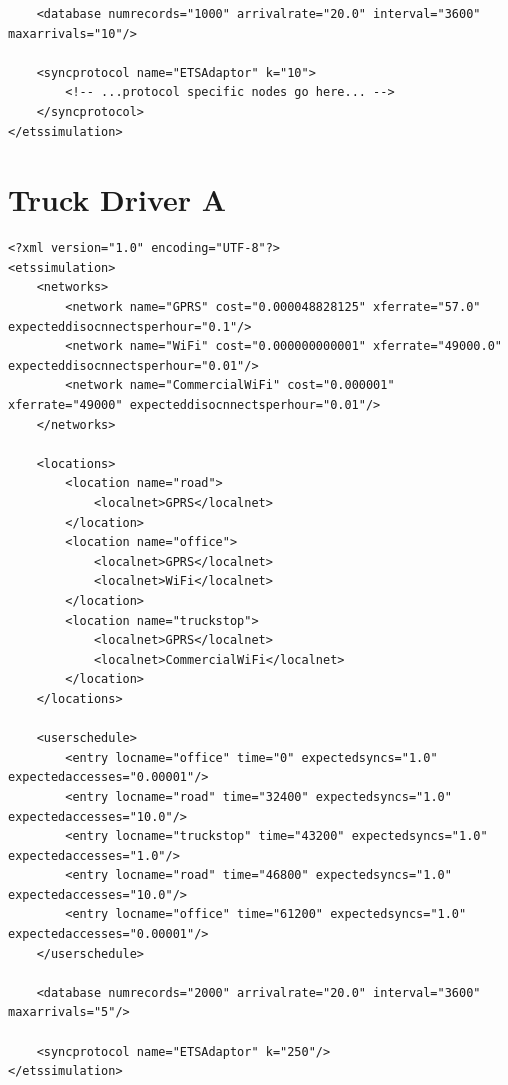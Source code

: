 \begin{lstlisting}
	<database numrecords="1000" arrivalrate="20.0" interval="3600" maxarrivals="10"/>
	
	<syncprotocol name="ETSAdaptor" k="10">
		<!-- ...protocol specific nodes go here... -->
	</syncprotocol>
</etssimulation>
\end{lstlisting}

\section{Truck Driver A}\label{trucker_a}

\begin{lstlisting}
<?xml version="1.0" encoding="UTF-8"?>
<etssimulation>
	<networks>
		<network name="GPRS" cost="0.000048828125" xferrate="57.0" expecteddisocnnectsperhour="0.1"/>
		<network name="WiFi" cost="0.000000000001" xferrate="49000.0" expecteddisocnnectsperhour="0.01"/>
		<network name="CommercialWiFi" cost="0.000001" xferrate="49000" expecteddisocnnectsperhour="0.01"/>
	</networks>

	<locations>
		<location name="road">
			<localnet>GPRS</localnet>
		</location>
		<location name="office">
			<localnet>GPRS</localnet>
			<localnet>WiFi</localnet>
		</location>
		<location name="truckstop">
			<localnet>GPRS</localnet>
			<localnet>CommercialWiFi</localnet>
		</location>
	</locations>

	<userschedule>
		<entry locname="office" time="0" expectedsyncs="1.0" expectedaccesses="0.00001"/>
		<entry locname="road" time="32400" expectedsyncs="1.0" expectedaccesses="10.0"/>
		<entry locname="truckstop" time="43200" expectedsyncs="1.0" expectedaccesses="1.0"/>
		<entry locname="road" time="46800" expectedsyncs="1.0" expectedaccesses="10.0"/>
		<entry locname="office" time="61200" expectedsyncs="1.0" expectedaccesses="0.00001"/>
	</userschedule>

	<database numrecords="2000" arrivalrate="20.0" interval="3600" maxarrivals="5"/>

	<syncprotocol name="ETSAdaptor" k="250"/>
</etssimulation>
\end{lstlisting}
